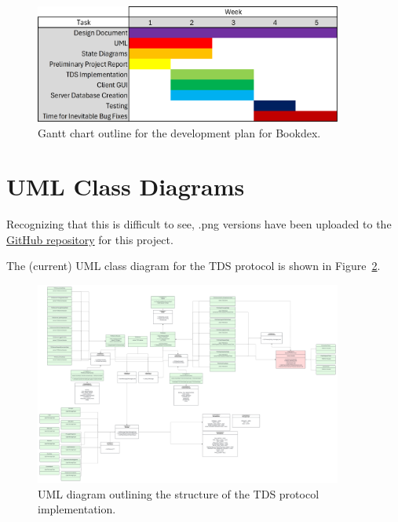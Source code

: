 \documentclass{article}
\newcommand{\repo}[1]{\href{https://github.com/SawyersCoding/bookdex/tree/main}{#1}}
\begin{document}
    \begin{figure}[h]
        \includegraphics[width=0.9\textwidth]{gantt_chart.png}
        \caption{Gantt chart outline for the development plan for Bookdex.}\label{fig:gantt}
    \end{figure}

\newpage
\section{UML Class Diagrams}\label{sec:uml}
    Recognizing that this is difficult to see, .png versions have been uploaded to the \repo{GitHub repository} for this project.

    The (current) UML class diagram for the TDS protocol is shown in Figure~\ref{fig:tdsuml}.

    \begin{figure}[h]
        \includegraphics[width=0.9\textwidth]{uml_tds.png}
        \caption{UML diagram outlining the structure of the TDS protocol implementation.}\label{fig:tdsuml}
    \end{figure}

\end{document}
